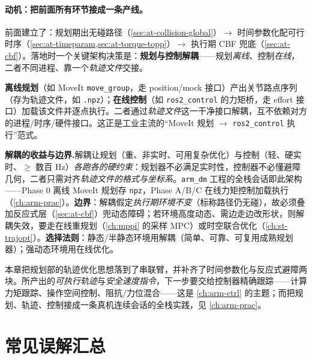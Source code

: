 \paragraph{动机：把前面所有环节接成一条产线。}
前面建立了：规划期出无碰路径（\cref{sec:at-collision-global}）$\to$ 时间参数化配可行时序（\cref{sec:at-timeparam,sec:at-torque-topp}）$\to$ 执行期 CBF 兜底（\cref{sec:at-cbf}）。落地时一个关键架构决策是：\textbf{规划与控制解耦}——规划\emph{离线}、控制\emph{在线}，二者不同进程、靠一个\emph{轨迹文件}交接。

\begin{definition}[规控解耦范式]\label{def:at-decouple}
\textbf{离线规划}（如 MoveIt \texttt{move\_group}，走 position/mock 接口）产出关节路点序列（存为轨迹文件，如 \texttt{.npz}）；\textbf{在线控制}（如 \texttt{ros2\_control} 的力矩桥，走 effort 接口）加载该文件并逐点执行。二者通过\emph{轨迹文件}这一干净接口解耦，互不依赖对方的进程/时序/硬件接口。这正是工业主流的“MoveIt 规划 $\to$ \texttt{ros2\_control} 执行”范式。
\end{definition}

\begin{insight}
\textbf{解耦的收益与边界.}\;解耦让规划（重、非实时、可用复杂优化）与控制（轻、硬实时、$\ge$ 数百 Hz）\emph{各跑各的硬约束}：规划器不必满足实时性，控制器不必懂避障几何，二者只需对齐\emph{轨迹文件的格式与坐标系}。\texttt{arm\_dm} 工程的全栈会话即此架构——Phase 0 离线 MoveIt 规划存 \texttt{npz}，Phase A/B/C 在线力矩控制加载执行（\cref{ch:arm-prac}）。\textbf{边界}：解耦假定\emph{执行期环境不变}（标称路径仍无碰），故必须叠加反应式层（\cref{sec:at-cbf}）兜动态障碍；若环境高度动态、需边走边改形状，则解耦失效，要走在线重规划（\cref{ch:mppi} 的采样 MPC）或时空联合优化（\cref{ch:st-trajopt}）。\textbf{选择法则}：静态/半静态环境用解耦（简单、可靠、可复用成熟规划器）；强动态环境用在线优化。
\end{insight}

本章把规划部的轨迹优化思想落到了串联臂，并补齐了时间参数化与反应式避障两块。所产出的\emph{可执行轨迹}与\emph{安全速度指令}，下一步要交给控制器精确跟踪——计算力矩跟踪、操作空间控制、阻抗/力位混合——这是 \cref{ch:arm-ctrl} 的主题；而把规划、轨迹、控制接成一条真机连续会话的全栈实践，见 \cref{ch:arm-prac}。

\section*{常见误解汇总}

